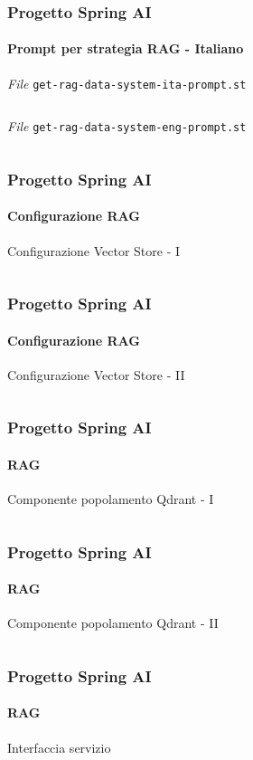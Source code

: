 %
\begin{frame}[t,fragile] \frametitle{Progetto Spring AI}
    \framesubtitle{Prompt per strategia RAG - Italiano}
        \begin{block}{\textit{File} \texttt{get-rag-data-system-ita-prompt.st}}
			{\scriptsize\inputminted{text}{code/get-rag-data-system-ita-prompt.st}}
    	\end{block}
        \vspace*{.3cm}
        \begin{block}{\textit{File} \texttt{get-rag-data-system-eng-prompt.st}}
			{\scriptsize\inputminted{text}{code/get-rag-data-system-eng-prompt.st}}
    	\end{block}
\end{frame}
%
\begin{frame}[t,fragile] \frametitle{Progetto Spring AI}
    \framesubtitle{Configurazione RAG}
        \begin{block}{Configurazione Vector Store - I}
			{\tiny\inputminted{java}{code/RAGConfig.java}}
    	\end{block}
\end{frame}
%
\begin{frame}[t,fragile] \frametitle{Progetto Spring AI}
    \framesubtitle{Configurazione RAG}
        \begin{block}{Configurazione Vector Store - II}
			{\tiny\inputminted{java}{code/RAGConfig-2.java}}
    	\end{block}
\end{frame}
%
\begin{frame}[t,fragile] \frametitle{Progetto Spring AI}
    \framesubtitle{RAG}
        \vspace*{-.7cm}
        \begin{block}{Componente popolamento Qdrant - I}
			{\tiny\inputminted{java}{code/TextDataLoader.java}}
    	\end{block}
\end{frame}
%
\begin{frame}[t,fragile] \frametitle{Progetto Spring AI}
    \framesubtitle{RAG}
        \vspace*{-.7cm}
        \begin{block}{Componente popolamento Qdrant - II}
			{\tiny\inputminted{java}{code/TextDataLoader-2.java}}
    	\end{block}
\end{frame}
%
\begin{frame}[t,fragile] \frametitle{Progetto Spring AI}
    \framesubtitle{RAG}
        \begin{block}{Interfaccia servizio}
			{\tiny\inputminted{java}{code/RAGService.java}}
    	\end{block}
\end{frame}
